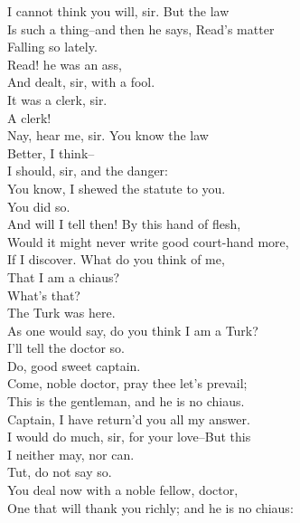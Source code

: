\documentclass{memoir}
\begin{document}
\begin{drama*}
\facespeaks  I cannot think you will, sir. But the law\\
 Is such a thing--and then he says, Read's matter\\
 Falling so lately.\\
\dapperspeaks {} Read! he was an ass,\\
 And dealt, sir, with a fool.\\
\facespeaks {} It was a clerk, sir.\\
\dapperspeaks  A clerk!\\
\facespeaks {} Nay, hear me, sir. You know the law\\
 Better, I think--\\
\dapperspeaks {} I should, sir, and the danger:\\
 You know, I shewed the statute to you.\\
\facespeaks  You did so.\\
\dapperspeaks {} And will I tell then! By this hand of flesh,\\
 Would it might never write good court-hand more,\\
 If I discover. What do you think of me,\\
 That I am a chiaus?\\
\facespeaks {} What's that?\\
\dapperspeaks {} The Turk was here.\\
 As one would say, do you think I am a Turk?\\
\facespeaks  I'll tell the doctor so.\\
\dapperspeaks {} Do, good sweet captain.\\
\facespeaks  Come, noble doctor, pray thee let's prevail;\\
 This is the gentleman, and he is no chiaus.\\
\subtlespeaks  Captain, I have return'd you all my answer.\\
 I would do much, sir, for your love--But this\\
 I neither may, nor can.\\
\facespeaks {} Tut, do not say so.\\
 You deal now with a noble fellow, doctor,\\
 One that will thank you richly; and he is no chiaus:\\

\end{drama*}
\end{document}
